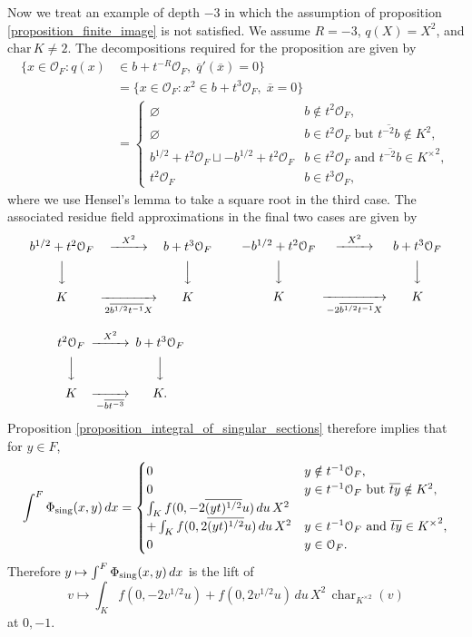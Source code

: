 \documentclass{lmsMODIFIED}
\newcommand{\roi}{\mathcal{O}}
\newcommand{\res}[1]{\overline{#1}}
\newcommand{\mult}[1]{#1^{\times}}
\newcommand{\sub}[1]{{\mbox{\scriptsize {#1}}}}
\DeclareMathOperator{\Char}{char}
\begin{document}
\begin{example}\label{example_nonsense}
Now we treat an example of depth $-3$ in which the assumption of proposition \ref{proposition_finite_image} is not satisfied. We assume $R=-3$, $q(X)=X^2$, and $\mbox{char}\, K \neq 2$. The decompositions required for the proposition are given by
\begin{align*}
\{x\in\roi_{F}:q(x)&\in b+t^{-R}\roi_{F},\;\res{q}'(\res{x})=0\}\\
	&=\{x\in\roi_{F}:x^2\in b+t^3\roi_{F},\;\res{x}=0\}\\
	&=\begin{cases}
		\varnothing & b\notin t^2\roi_{F},\\
		\varnothing & b\in t^2\roi_{F}\mbox{ but }\res{t^{-2}b}\notin K^2,\\
		b^{1/2}+t^2\roi_{F} \sqcup -b^{1/2}+t^2\roi_{F} & b\in t^2\roi_{F}\mbox{ and }\res{t^{-2}b}\in{\mult{K}}^2,\\
		t^2\roi_{F} & b\in t^3\roi_{F},
	\end{cases}
\end{align*}
where we use Hensel's lemma to take a square root in the third case. The associated residue field approximations in the final two cases are given by
\[\begin{array}{ccc}
\begin{CD}
b^{1/2}+t^2\roi_{F} @>X^2>>b+t^3\roi_{F} \\
@VVV  @VVV  \\
 K  @>>2\res{b^{1/2}t^{-1}}X>  K 
\end{CD}
&\,\,&
\begin{CD}
-b^{1/2}+t^2\roi_{F} @>X^2>>b+t^3\roi_{F} \\
@VVV  @VVV  \\
 K  @>>-2\res{b^{1/2}t^{-1}}X>  K 
\end{CD}\\
&&\\
\begin{CD}
t^2\roi_{F} @>X^2>>b+t^3\roi_{F} \\
@VVV  @VVV  \\
 K  @>>-\res{bt^{-3}}>  K .
\end{CD}
&&\\
\end{array}\]
Proposition \ref{proposition_integral_of_singular_sections} therefore implies that for $y\in F$,
\[\int^F\Phi_\sub{sing}(x,y)\,dx\\
	=\begin{cases}
		0 & y\notin t^{-1}\roi_{F}, \\
		0 & y\in t^{-1}\roi_{F}\mbox{ but }\res{ty}\notin K^2,\\
		\int_K f(0, -2\res{(yt)^{1/2}}u)\,du\,X^2\\+ \int_K f(0, 2\res{(yt)^{1/2}}u)\,du\,X^2 & y\in t^{-1}\roi_{F}\mbox{ and }\res{ty}\in{\mult{K}}^2,\\
		0 & y\in \roi_{F}.
	\end{cases}\]
Therefore $y\mapsto \int^F\Phi_\sub{sing}(x,y)\,dx$ is the lift of \[v\mapsto \int_K f(0, -2v^{1/2}u)+f(0, 2v^{1/2}u)\,du\,X^2\,\Char_{K^{\times 2}}(v)\] at $0,-1$.


\end{example}
\end{document}
